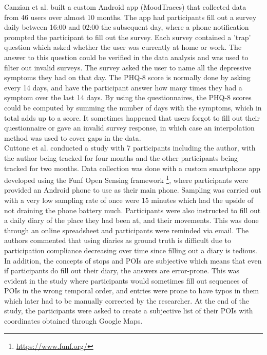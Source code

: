 Canzian et al. built a custom Android app (MoodTraces) that collected data from 46 users over almost 10 months. The app had participants fill out a survey daily between 16:00 and 02:00 the subsequent day, where a phone notification prompted the participant to fill out the survey. Each survey contained a 'trap' question which asked whether the user was currently at home or work. The answer to this question could be verified in the data analysis and was used to filter out invalid surveys. The survey asked the user to name all the depressive symptoms they had on that day. The PHQ-8 score is normally done by asking every 14 days, and have the participant answer how many times they had a symptom over the last 14 days. By using the questionnaires, the PHQ-8 scores could be computed by summing the number of days with the symptoms, which in total adds up to a score. It sometimes happened that users forgot to fill out their questionnaire or gave an invalid survey response, in which case an interpolation method was used to cover gaps in the data.\\

Cuttone et al. conducted a study with 7 participants including the author, with the author being tracked for four months and the other participants being tracked for two months. Data collection was done with a custom smartphone app developed using the Funf Open Sensing framework \footnote{\url{https://www.funf.org/}}, where participants were provided an Android phone to use as their main phone. Sampling was carried out with a very low sampling rate of once were 15 minutes which had the upside of not draining the phone battery much. Participants were also instructed to fill out a daily diary of the place they had been at, and their movements. This was done through an online spreadsheet and participants were reminded via email. The authors commented that using diaries as ground truth is difficult due to participation compliance decreasing over time since filling out a diary is tedious. In addition, the concepts of stops and POIs are subjective which means that even if participants do fill out their diary, the answers are error-prone. This was evident in the study where participants would sometimes fill out sequences of POIs in the wrong temporal order, and entries were prone to have typos in them which later had to be manually corrected by the researcher. At the end of the study, the participants were asked to create a subjective list of their POIs with coordinates obtained through Google Maps. \\

